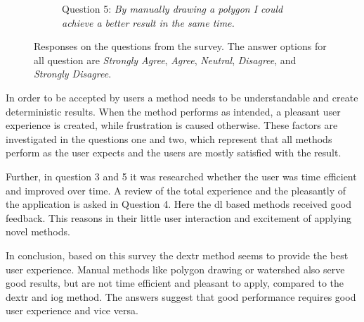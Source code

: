 \begin{figure}
\begin{subfigure}[t]{0.48\textwidth}
		\caption{
			Question 5: \textit{By manually drawing a polygon I could achieve a better result in the same time.}
		} \label{fig:ch5:sec4:q5}
	\end{subfigure}
	\caption [Watershed User Interaction]{
		Responses on the questions from the survey.
		The answer options for all question are \textit{Strongly Agree}, \textit{Agree}, \textit{Neutral}, \textit{Disagree}, and \textit{Strongly Disagree}.
	} \label{fig:ch5:sec4:suvery}
\end{figure}

In order to be accepted by users a method needs to be understandable and create deterministic results.
When the method performs as intended, a pleasant user experience is created, while frustration is caused otherwise.
These factors are investigated in the questions one and two, which represent that all methods perform as the user expects and the users are mostly satisfied with the result.

Further, in question 3 and 5 it was researched whether the user was time efficient and improved over time.
A review of the total experience and the pleasantly of the application is asked in Question 4.
Here the \gls{dl} based methods received good feedback.
This reasons in their little user interaction and excitement of applying novel methods.

In conclusion, based on this survey the \gls{dextr} method seems to provide the best user experience.
Manual methods like polygon drawing or watershed also serve good results, but are not time efficient and pleasant to apply, compared to the \gls{dextr} and \gls{iog} method.
The answers suggest that good performance requires good user experience and vice versa.


